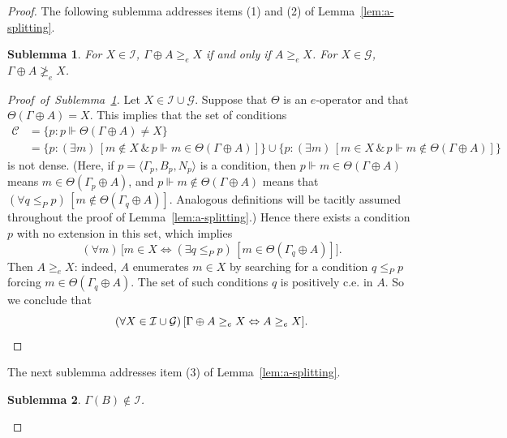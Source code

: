\documentclass[11pt]{amsart}
\newtheorem{sublemma}{Sublemma}
\newcommand{\QA}[1]{(\forall{#1})\,}
\newcommand{\QE}[1]{(\exists{#1})\,}
\begin{document}
\begin{proof}
The following sublemma addresses items (1) and (2) of 
Lemma~\ref{lem:a-splitting}. 
 
\begin{sublemma}\label{lem:1}
For $X \in \mathcal{I}$,  $\Gamma \oplus A\geq_e X $ if and only if $A \geq_e 
X$. For $X \in \mathcal{G}$, $\Gamma \oplus A \ngeq_e X$. 
\end{sublemma}

\begin{proof}[Proof~of~Sublemma~\ref{lem:1}] 
Let $X \in \mathcal{I} \cup \mathcal{G}$. Suppose that $\Theta$ is an $e$-operator and 
that $\Theta(\Gamma\oplus A)=X$. This implies that the set of conditions 
\begin{align*}
\mathcal{C} &=\{p: p \Vdash \Theta(\Gamma\oplus A)\ne X\}\\
            &=\{p: \QE{m}\left [m \notin X \,\&\, p \Vdash m \in \Theta(\Gamma 
      \oplus A)\right]\} \cup \{p: \QE{m} \left[ m \in X \,\&\, p \Vdash m \notin 
      \Theta(\Gamma \oplus A) \right]\} 
\end{align*}
is not dense. (Here, if $p=\langle \Gamma_p, B_p, N_p \rangle$ is a 
condition, then $p \Vdash m \in \Theta(\Gamma \oplus A)$ means $m \in 
\Theta(\Gamma_p \oplus A)$, and $p \Vdash m \notin \Theta(\Gamma \oplus A)$ 
means that $\QA{q \le_{P} p}[m \notin \Theta(\Gamma_q \oplus A)]$. Analogous 
definitions will be tacitly assumed throughout the proof of 
Lemma~\ref{lem:a-splitting}.) Hence there exists a condition $p$ with no 
extension in this set, which implies 
\[
\QA{m} \big[ m \in X \Leftrightarrow \QE{q\leq_P p} 
[m \in \Theta(\Gamma_q \oplus A) ] \big].
\] 
Then $A\geq_e X$: indeed, $A$ enumerates $m \in X$ by searching for a 
condition $q \leq_P p$ forcing $m \in \Theta(\Gamma_q\oplus A)$. The set of 
such conditions $q$ is positively c.e. in $A$. So we conclude that 
\[
\QA{X \in \mathcal{I} \cup \mathcal{G}}[ \Gamma \oplus A \geq_e
X \Leftrightarrow A \geq_e X]. \qedhere
\] 
\end{proof}

The next sublemma addresses item (3) of Lemma~\ref{lem:a-splitting}. 

\begin{sublemma}\label{lem:2}
$\Gamma(B) \notin \mathcal{I}$. 
\end{sublemma}


\end{proof}
\end{document}
